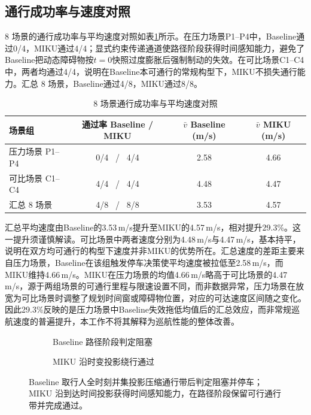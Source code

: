 \documentclass[a4paper,11pt]{ctexart}
\providecommand{\datapath}{../../图片/data/01_crossing_ped/}
\theoremstyle{definition}
\begin{document}
\subsection{通行成功率与速度对照}
\label{subsec:exp_passrate}

8 场景的通行成功率与平均速度对照如表\ref{tab:exp_pass}所示。在压力场景P1--P4中，Baseline通过0/4，MIKU通过4/4；显式约束传递通道使路径阶段获得时间感知能力，避免了Baseline把动态障碍物按$t=0$快照过度膨胀后强制制动的失效。在可比场景C1--C4中，两者均通过4/4，说明在Baseline本可通行的常规构型下，MIKU不损失通行能力。汇总 8 场景，Baseline通过4/8，MIKU通过8/8。

\begin{table}[htbp]
\centering
\caption{8 场景通行成功率与平均速度对照}
\label{tab:exp_pass}
\small
\begin{tabular}{lccc}
\toprule
\textbf{场景组} & \textbf{通过率 Baseline / MIKU} & \textbf{$\bar v$ Baseline (m/s)} & \textbf{$\bar v$ MIKU (m/s)} \\
\midrule
压力场景 P1--P4 & 0/4 \ / \ 4/4 & 2.58 & 4.66 \\
可比场景 C1--C4 & 4/4 \ / \ 4/4 & 4.48 & 4.47 \\
\midrule
汇总 8 场景 & 4/8 \ / \ 8/8 & 3.53 & 4.57 \\
\bottomrule
\end{tabular}
\end{table}

汇总平均速度由Baseline的3.53\,m/s提升至MIKU的4.57\,m/s，相对提升29.3\%。这一提升须谨慎解读。可比场景中两者速度分别为4.48\,m/s与4.47\,m/s，基本持平，说明在双方均可通行的构型下速度并非MIKU的优势所在。汇总速度的差距主要来自压力场景，Baseline在该组触发停车决策使平均速度被拉低至2.58\,m/s，而MIKU维持4.66\,m/s。MIKU在压力场景的均值4.66\,m/s略高于可比场景的4.47\,m/s，源于两组场景的可通行里程与限速设置不同，而非数据异常，压力场景在放宽为可比场景时调整了规划时间窗或障碍物位置，对应的可达速度区间随之变化。因此29.3\%反映的是压力场景中Baseline失效拖低均值后的汇总效应，而非常规巡航速度的普遍提升，本工作不将其解释为巡航性能的整体改善。

\begin{figure}[htbp]
\centering
\begingroup
\renewcommand{\datapath}{../../图片/data/01_crossing_ped/}
\begin{subfigure}[b]{0.46\textwidth}
  \centering
  \caption{Baseline 路径阶段判定阻塞}
\end{subfigure}\hfill
\begin{subfigure}[b]{0.46\textwidth}
  \centering
  \caption{MIKU 沿时变投影绕行通过}
\end{subfigure}
\endgroup
\caption{压力场景 P1 单行人横穿的 SL 路径边界对照}
\caption*{Baseline 取行人全时刻并集投影压缩通行带后判定阻塞并停车；MIKU 沿到达时间投影获得时间感知能力，在路径阶段保留可行通行带并完成通过。}
\label{fig:exp_p1_sl}
\end{figure}
\end{document}
